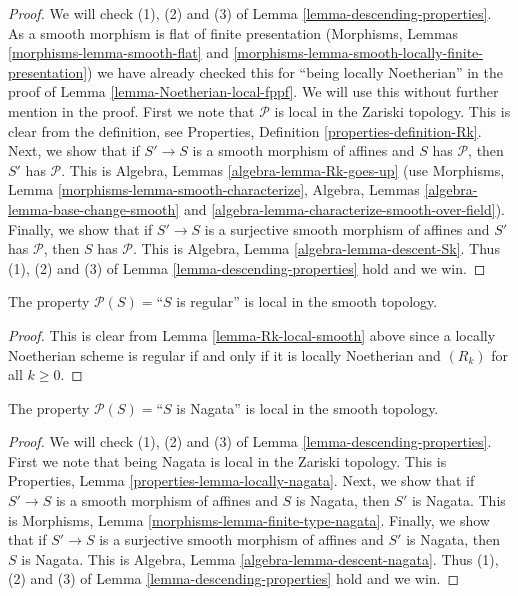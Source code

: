 \begin{proof}
We will check (1), (2) and (3) of Lemma \ref{lemma-descending-properties}.
As a smooth morphism is flat of finite presentation
(Morphisms, Lemmas \ref{morphisms-lemma-smooth-flat}
and \ref{morphisms-lemma-smooth-locally-finite-presentation})
we have already checked this for ``being locally Noetherian'' in the proof
of Lemma \ref{lemma-Noetherian-local-fppf}.
We will use this without further mention in the proof.
First we note that $\mathcal{P}$ is local in the Zariski topology.
This is clear from the definition,
see Properties, Definition \ref{properties-definition-Rk}.
Next, we show that if $S' \to S$ is a smooth morphism of affines
and $S$ has $\mathcal{P}$, then $S'$ has $\mathcal{P}$. This
is Algebra, Lemmas \ref{algebra-lemma-Rk-goes-up}
(use Morphisms, Lemma \ref{morphisms-lemma-smooth-characterize},
Algebra, Lemmas \ref{algebra-lemma-base-change-smooth}
and \ref{algebra-lemma-characterize-smooth-over-field}).
Finally, we show that if $S' \to S$ is a surjective
smooth morphism of affines and $S'$ has $\mathcal{P}$,
then $S$ has $\mathcal{P}$. This is
Algebra, Lemma \ref{algebra-lemma-descent-Sk}.
Thus (1), (2) and (3) of Lemma \ref{lemma-descending-properties} hold
and we win.
\end{proof}

\begin{lemma}
\label{lemma-regular-local-smooth}
The property $\mathcal{P}(S) =$``$S$ is regular''
is local in the smooth topology.
\end{lemma}

\begin{proof}
This is clear from Lemma \ref{lemma-Rk-local-smooth}
above since a locally Noetherian scheme is regular if and only if
it is locally Noetherian and $(R_k)$ for all $k \geq 0$.
\end{proof}

\begin{lemma}
\label{lemma-Nagata-local-smooth}
The property $\mathcal{P}(S) =$``$S$ is Nagata''
is local in the smooth topology.
\end{lemma}

\begin{proof}
We will check (1), (2) and (3) of Lemma \ref{lemma-descending-properties}.
First we note that being Nagata is local in the Zariski topology.
This is Properties, Lemma \ref{properties-lemma-locally-nagata}.
Next, we show that if $S' \to S$ is a smooth morphism of affines
and $S$ is Nagata, then $S'$ is Nagata. This
is Morphisms, Lemma \ref{morphisms-lemma-finite-type-nagata}.
Finally, we show that if $S' \to S$ is a surjective
smooth morphism of affines and $S'$ is Nagata,
then $S$ is Nagata. This is
Algebra, Lemma \ref{algebra-lemma-descent-nagata}.
Thus (1), (2) and (3) of Lemma \ref{lemma-descending-properties} hold
and we win.
\end{proof}





